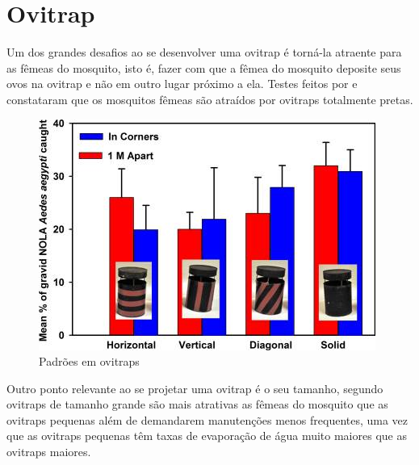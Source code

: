 \documentclass[
	12pt,				%
	openright,			%
	oneside,			%
	a4paper,			%
	chapter=TITLE,		%
	english,			%
	brazil				%
	]{abntex2}
\begin{document}
\section{Ovitrap}
Um dos grandes desafios ao se desenvolver uma ovitrap é torná-la atraente para as fêmeas do mosquito, isto é, fazer com que a fêmea 
do mosquito deposite seus ovos na ovitrap 
e não em outro lugar próximo a ela. Testes feitos por \cite{DAVIDF2011} e \cite{VALERIE2016} constataram que os mosquitos fêmeas 
são atraídos por ovitraps totalmente pretas.

\begin{figure}[H]
\centering
\includegraphics[scale=0.7]{imagens/tileshop.jpeg}
\caption{Padrões em ovitraps}
\end{figure}

Outro ponto relevante ao se projetar uma ovitrap é o seu tamanho, segundo \cite{BRIANJJOHNSON2017} ovitraps de tamanho grande são 
mais atrativas as fêmeas do mosquito
 que as ovitraps pequenas além de demandarem manutenções menos frequentes, uma vez que as ovitraps pequenas têm taxas de evaporação 
 de água muito maiores que as ovitraps maiores.
\end{document}
